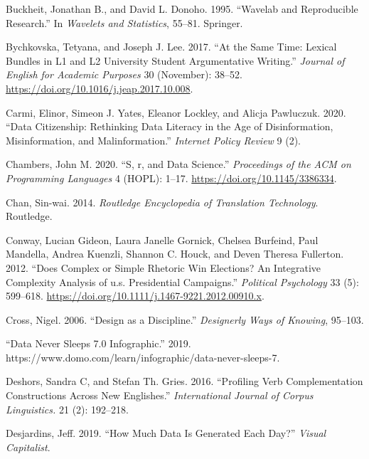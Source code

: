 \documentclass[
  letterpaper,
]{latex/krantz}
\newlength{\cslhangindent}
\newlength{\cslentryspacingunit} %
\newenvironment{CSLReferences}[2] %
 {%
  \setlength{\parindent}{0pt}
  \ifodd #1
  \let\oldpar\par
  \def\par{\hangindent=\cslhangindent\oldpar}
  \fi
  \setlength{\parskip}{#2\cslentryspacingunit}
 }%
 {}
\begin{document}
\begin{CSLReferences}{1}{0}
\leavevmode{}%
Buckheit, Jonathan B., and David L. Donoho. 1995. {``Wavelab and
Reproducible Research.''} In \emph{Wavelets and Statistics}, 55--81.
Springer.

\leavevmode{}%
Bychkovska, Tetyana, and Joseph J. Lee. 2017. {``At the Same Time:
Lexical Bundles in L1 and L2 University Student Argumentative
Writing.''} \emph{Journal of English for Academic Purposes} 30
(November): 38--52. \url{https://doi.org/10.1016/j.jeap.2017.10.008}.

\leavevmode{}%
Carmi, Elinor, Simeon J. Yates, Eleanor Lockley, and Alicja Pawluczuk.
2020. {``Data Citizenship: Rethinking Data Literacy in the Age of
Disinformation, Misinformation, and Malinformation.''} \emph{Internet
Policy Review} 9 (2).

\leavevmode{}%
Chambers, John M. 2020. {``S, r, and Data Science.''} \emph{Proceedings
of the ACM on Programming Languages} 4 (HOPL): 1--17.
\url{https://doi.org/10.1145/3386334}.

\leavevmode{}%
Chan, Sin-wai. 2014. \emph{Routledge Encyclopedia of Translation
Technology}. Routledge.

\leavevmode{}%
Conway, Lucian Gideon, Laura Janelle Gornick, Chelsea Burfeind, Paul
Mandella, Andrea Kuenzli, Shannon C. Houck, and Deven Theresa Fullerton.
2012. {``Does Complex or Simple Rhetoric Win Elections? An Integrative
Complexity Analysis of u.s. Presidential Campaigns.''} \emph{Political
Psychology} 33 (5): 599--618.
\url{https://doi.org/10.1111/j.1467-9221.2012.00910.x}.

\leavevmode{}%
Cross, Nigel. 2006. {``Design as a Discipline.''} \emph{Designerly Ways
of Knowing}, 95--103.

\leavevmode{}%
{``Data Never Sleeps 7.0 Infographic.''} 2019.
https://www.domo.com/learn/infographic/data-never-sleeps-7.

\leavevmode{}%
Deshors, Sandra C, and Stefan Th. Gries. 2016. {``Profiling Verb
Complementation Constructions Across New Englishes.''}
\emph{International Journal of Corpus Linguistics.} 21 (2): 192--218.

\leavevmode{}%
Desjardins, Jeff. 2019. {``How Much Data Is Generated Each Day?''}
\emph{Visual Capitalist}.


\end{CSLReferences}
\end{document}

